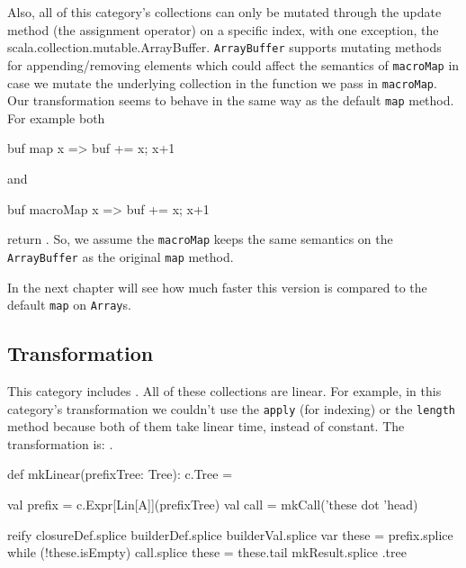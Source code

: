 Also, all of this category's collections can only be mutated through the
update method (the assignment operator) on a specific index, with one
exception, the scala.\allowbreak{}collection.\allowbreak{}mutable.\allowbreak{}ArrayBuffer. 
\texttt{ArrayBuffer} supports mutating methods for appending/removing elements which could affect the
semantics of \texttt{macroMap} in case we mutate the underlying collection in the
function we pass in \texttt{macroMap}. Our transformation seems to behave in the same
way as the default \texttt{map} method. For example both

\begin{scalaCode}
buf map {x => buf += x; x+1 }
\end{scalaCode}

and

\begin{scalaCode}
buf macroMap { x => buf += x; x+1 }
\end{scalaCode}

return .
So, we assume the \texttt{macroMap} keeps the
same semantics on the \texttt{ArrayBuffer} as the original \texttt{map} method.

In the next chapter will see how much faster this version is compared to the
default \texttt{map} on \texttt{Array}s.

\subsection{ Transformation}

This category includes . All of these collections are linear.
For example, in this category's transformation we couldn't use the \texttt{apply} (for
indexing) or the \texttt{length} method because both of them take linear time, instead of
constant. The transformation is: .

\begin{scalaCode}
 def mkLinear(prefixTree: Tree): c.Tree = {
  val prefix    = c.Expr[Lin[A]](prefixTree)
  val call = mkCall('these dot 'head)

  reify {
    closureDef.splice
    builderDef.splice
    builderVal.splice
    var these = prefix.splice
    while (!these.isEmpty) {
      call.splice
      these = these.tail
    }
    mkResult.splice
  }.tree
}
\end{scalaCode}


